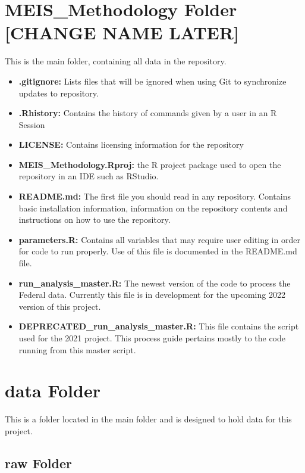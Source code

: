 \documentclass[
]{book}
\providecommand{\tightlist}{%
  \setlength{\itemsep}{0pt}\setlength{\parskip}{0pt}}
\begin{document}
\hypertarget{meis_methodology-folder-change-name-later}{%
\section{MEIS\_Methodology Folder {[}CHANGE NAME LATER{]}}\label{meis_methodology-folder-change-name-later}}

This is the main folder, containing all data in the repository.

\begin{itemize}
\tightlist
\item
  \textbf{.gitignore:} Lists files that will be ignored when using Git to synchronize updates to repository.
\item
  \textbf{.Rhistory:} Contains the history of commands given by a user in an R Session
\item
  \textbf{LICENSE:} Contains licensing information for the repository
\item
  \textbf{MEIS\_Methodology.Rproj:} the R project package used to open the repository in an IDE such as RStudio.
\item
  \textbf{README.md:} The first file you should read in any repository. Contains basic installation information, information on the repository contents and instructions on how to use the repository.
\item
  \textbf{parameters.R:} Contains all variables that may require user editing in order for code to run properly. Use of this file is documented in the README.md file.
\item
  \textbf{run\_analysis\_master.R:} The newest version of the code to process the Federal data. Currently this file is in development for the upcoming 2022 version of this project.
\item
  \textbf{DEPRECATED\_run\_analysis\_master.R:} This file contains the script used for the 2021 project. This process guide pertains mostly to the code running from this master script.
\end{itemize}

\hypertarget{data-folder}{%
\section{data Folder}\label{data-folder}}

This is a folder located in the main folder and is designed to hold data for this project.

\hypertarget{raw-folder}{%
\subsection{raw Folder}\label{raw-folder}}
\end{document}
